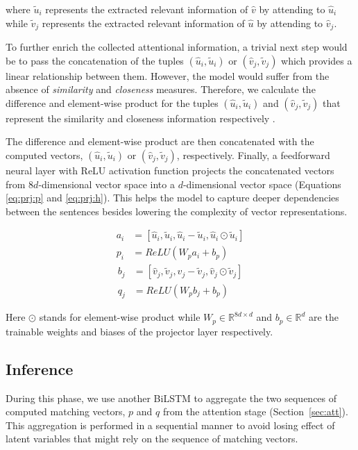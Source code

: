 \documentclass[11pt,a4paper]{article}
\begin{document}
	\noindent where $\tilde{u}_i$ represents the extracted relevant information of $\hat{v}$ by attending to $\hat{u}_i$ while $\tilde{v}_j$ represents the extracted relevant information of $\hat{u}$ by attending to $\hat{v}_j$. 
	
	To further enrich the collected attentional information, a trivial next step would be to pass the concatenation of the tuples $(\hat{u}_i, \tilde{u}_i)$ or $(\hat{v}_j, \tilde{v}_j)$ which provides a linear relationship between them. However, the model would suffer from the absence of \emph{similarity} and \emph{closeness} measures. Therefore, we calculate the difference and element-wise product for the tuples $(\hat{u}_i, \tilde{u}_i)$ and $(\hat{v}_j, \tilde{v}_j)$ that represent the similarity and closeness information respectively \cite{him2017,ama}.
	
	The difference and element-wise product are then concatenated with the computed vectors, $(\hat{u}_i, \tilde{u}_i)$ or $(\hat{v}_j, \tilde{v}_j)$, respectively. Finally, a feedforward neural layer with ReLU activation function projects the concatenated vectors from $8d$-dimensional vector space into a $d$-dimensional vector space (Equations \ref{eq:prj:p} and \ref{eq:prj:h}). This helps the model to capture deeper dependencies between the sentences besides lowering the complexity of vector representations.
	
	\begin{equation}
	\begin{split}
	a_i &= [\hat{u}_i, \tilde{u}_i, \hat{u}_i -\tilde{u}_i, \hat{u}_i \odot \tilde{u}_i] \\
	p_i &=  \textit{ReLU}(W_p a_i + b_p)
	\end{split}
	\label{eq:prj:p}
	\end{equation}
	\begin{equation}
	\begin{split}
	b_j &= [\hat{v}_j, \tilde{v}_j, \hat{v}_j -\tilde{v}_j, \hat{v}_j \odot \tilde{v}_j] \\
	q_j &=  \textit{ReLU}(W_p b_j + b_p)
	\end{split}
	\label{eq:prj:h}
	\end{equation}
	
	\noindent Here $\odot$ stands for element-wise product while $W_p \in \mathbb{R}^{8d\times d}$ and $b_p \in \mathbb{R}^{d}$ are the trainable weights and biases of the projector layer respectively.
	
	\subsection{Inference}
	During this phase, we use another BiLSTM to aggregate the two sequences of computed matching vectors, $p$ and $q$ from the attention stage (Section~\ref{sec:att}). This aggregation is performed in a sequential manner to avoid losing effect of latent variables that might rely on the sequence of matching vectors. 
	
\end{document}
